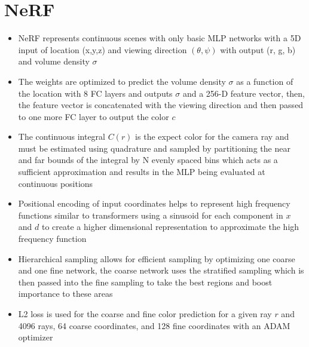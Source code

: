 \documentclass[12pt, a4paper]{article}
\begin{document}
\clearpage
\section{NeRF}
\begin{itemize}
    \item NeRF represents continuous scenes with only basic MLP networks with a 5D input of location (x,y,z) and viewing direction $(\theta, \psi)$ with output (r, g, b) and volume density $\sigma$
    \item The weights are optimized to predict the volume density $\sigma$ as a function of the location  with 8 FC layers and outputs $\sigma$ and a 256-D feature vector, then, the feature vector is concatenated with the viewing direction and then passed to one more FC layer to output the color $c$
    \item The continuous integral $C(r)$ is the expect color for the camera ray and must be estimated using quadrature and sampled by partitioning the near and far bounds of the integral by N evenly spaced bins which acts as a sufficient approximation and results in the MLP being evaluated at continuous positions
    \item Positional encoding of input coordinates helps to represent high frequency functions similar to transformers using a sinusoid for each component in $x$ and $d$ to create a higher dimensional representation to approximate the high frequency function
    \item Hierarchical sampling allows for efficient sampling by optimizing one coarse and one fine network, the coarse network uses the stratified sampling which is then passed into the fine sampling to take the best regions and boost importance to these areas
    \item L2 loss is used for the coarse and fine color prediction for a given ray $r$ and 4096 rays, 64 coarse coordinates, and 128 fine coordinates with an ADAM optimizer
\end{itemize}
\end{document}
